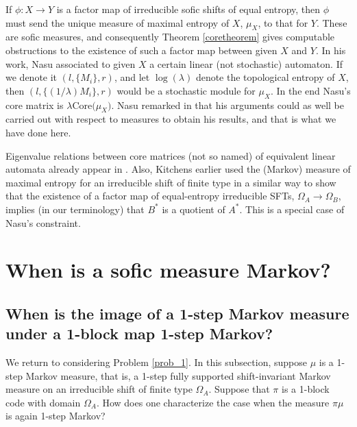 \documentclass{kepart2010}
\theoremstyle{plain}
\theoremstyle{definition}
\theoremstyle{remark}
\theoremstyle{definition}
\numberwithin{equation}{section}
\begin{document}
If $\phi : X\to Y$ is a factor map of irreducible sofic
shifts of equal entropy, then $\phi$ must send the
unique measure of maximal entropy of $X$, $\mu_X$,
 to that for
$Y$. These are sofic measures, and consequently
Theorem \ref{coretheorem} gives computable obstructions
to the existence of such a factor map between given
$X$ and $Y$.
In his work, Nasu associated to given $X$ a certain
linear (not stochastic)
automaton. If we denote it $(l,\{M_i\},r)$,
and let $\log (\lambda)$ denote the topological entropy of
$X$, then $(l,\{(1/\lambda )M_i\},r)$ would be a stochastic
module for $\mu_X$. In the end Nasu's core matrix is
$\lambda \text{Core}\text{(}\mu_X\text{)}$.
Nasu remarked in \cite{Nasu1985}
that his arguments could as well be
carried out with respect to measures to obtain his results,
and that is what we have done here.

Eigenvalue relations between core matrices (not so named)
of equivalent linear automata already appear in
\cite[Sec.7]{InagakiFutumuraMutuura1972}. Also,
Kitchens
\cite{Kitchens1981} earlier used the (Markov) measure of
maximal entropy for an irreducible shift of finite type
in a similar way to show that the existence of a factor
map of equal-entropy irreducible SFTs, $\Omega_A \to
\Omega_B$, implies (in our terminology)
that $B^*$ is a quotient of $A^*$. This is a special
case of Nasu's constraint.

\section{When is a sofic measure Markov?}
\label{sec_markov}

\subsection{When is the image of a 1-step Markov measure under a 1-block
map 1-step Markov?}\label{sec_when}

We return to considering Problem \ref{prob_1}. In this subsection,
suppose $\mu$ is a 1-step Markov measure, that is, a 1-step fully
supported shift-invariant Markov measure on an irreducible shift of
finite type $\Omega_A$. Suppose that $\pi$ is a 1-block code with
domain $\Omega_A$. How does one characterize the case
when the measure
 $\pi\mu$
 is again 1-step Markov?
\end{document}
